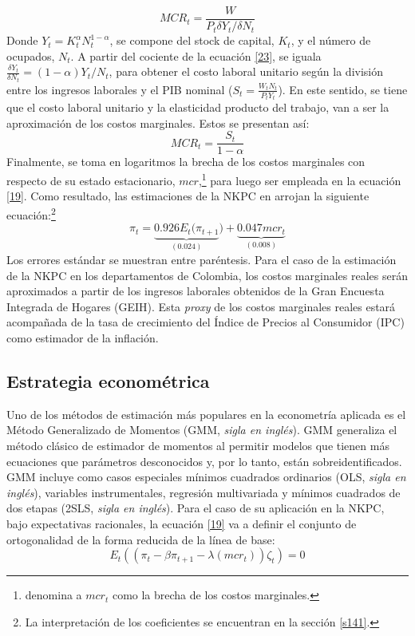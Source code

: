 \begin{equation}\label{23}
MCR_{t}=\frac{W}{P_{t}\delta Y_{t}/\delta N_{t}} 
\end{equation}
Donde  $Y_{t}=K_{t}^{\alpha} N_{t}^{1-\alpha}$, se compone del stock de capital, $K_{t}$, y  el número de ocupados, $N_{t}$. A partir del cociente de la ecuación \eqref{23},  se iguala $\frac{\delta Y_{t}}{\delta N_{t}}=(1-\alpha)Y_{t}/N_{t}$, para obtener  el costo laboral unitario según la división entre los ingresos laborales y  el PIB nominal ($S_{t}=\frac{W_{t}N_{t}}{P_{t}Y_{t}}$). En este sentido, se tiene que el costo  laboral unitario y la elasticidad producto del trabajo, van a ser la aproximación de los costos marginales. Estos se presentan así:
\begin{equation}\label{24}
MCR_{t}=\frac{S_{t}}{1-\alpha}
\end{equation}
Finalmente, se toma en logaritmos la brecha de los costos marginales con respecto de su estado estacionario, $mcr$,\footnote{\cite{galvis2010estimacion} denomina a $mcr_{t}$ como la brecha de los costos marginales.}  para luego ser empleada en la ecuación \eqref{19}. Como resultado, las estimaciones de la NKPC en \cite{gali1999inflation} arrojan la siguiente ecuación:\footnote{La interpretación de los coeficientes se encuentran en la sección \ref{s141}.} 
\begin{equation}\label{25}
\pi_{t}= \underbrace{0.926 E_{t}(\pi_{t+1}}_{(0.024)})+\underbrace{0.047 mcr_{t}}_{(0.008)}
\end{equation}
Los errores estándar se muestran entre paréntesis. Para el caso de la estimación de la NKPC en los departamentos de Colombia, los costos marginales reales serán aproximados a partir de los ingresos laborales obtenidos de la Gran Encuesta Integrada de Hogares (GEIH). Esta \textit{proxy} de los costos marginales reales estará acompañada de la tasa de crecimiento del Índice de Precios al Consumidor (IPC) como estimador de la inflación.

 \subsection{Estrategia econométrica}  \label{secgmm}
Uno de los métodos de estimación más populares en la econometría aplicada es el Método Generalizado de Momentos (GMM, \textit{sigla en inglés}). GMM generaliza el método clásico de estimador de momentos al permitir modelos que tienen más ecuaciones que parámetros desconocidos y, por lo tanto, están sobreidentificados. GMM incluye como casos especiales  mínimos cuadrados ordinarios (OLS, \textit{sigla en inglés}), variables instrumentales, regresión multivariada y mínimos cuadrados de dos etapas (2SLS, \textit{sigla en inglés}). Para el caso de su aplicación en la NKPC, bajo expectativas racionales, la ecuación \eqref{19} va a definir el conjunto de ortogonalidad de la forma reducida de la línea de base:%
\begin{equation}\label{22}
E_{t}((\pi_{t}-\beta  \pi_{t+1}-\lambda(mcr_{t}))\zeta_{t})=0
\end{equation}

